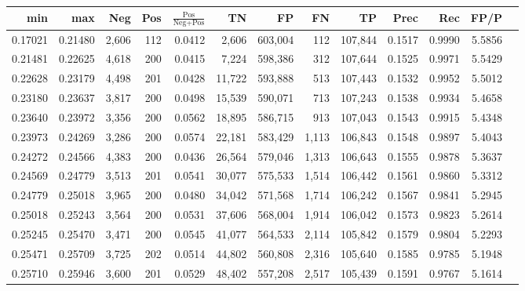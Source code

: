 \begin{tabular}{rrrrrrrrrrrrr}
\toprule
    min &     max &   Neg & Pos & $\frac{\text{Pos}}{\text{Neg}+\text{Pos}}$ &      TN &      FP &      FN &      TP &   Prec &    Rec &   FP/P \\
\midrule
0.17021 & 0.21480 & 2,606 & 112 &                                     0.0412 &   2,606 & 603,004 &     112 & 107,844 & 0.1517 & 0.9990 & 5.5856 \\
0.21481 & 0.22625 & 4,618 & 200 &                                     0.0415 &   7,224 & 598,386 &     312 & 107,644 & 0.1525 & 0.9971 & 5.5429 \\
0.22628 & 0.23179 & 4,498 & 201 &                                     0.0428 &  11,722 & 593,888 &     513 & 107,443 & 0.1532 & 0.9952 & 5.5012 \\
0.23180 & 0.23637 & 3,817 & 200 &                                     0.0498 &  15,539 & 590,071 &     713 & 107,243 & 0.1538 & 0.9934 & 5.4658 \\
0.23640 & 0.23972 & 3,356 & 200 &                                     0.0562 &  18,895 & 586,715 &     913 & 107,043 & 0.1543 & 0.9915 & 5.4348 \\
0.23973 & 0.24269 & 3,286 & 200 &                                     0.0574 &  22,181 & 583,429 &   1,113 & 106,843 & 0.1548 & 0.9897 & 5.4043 \\
0.24272 & 0.24566 & 4,383 & 200 &                                     0.0436 &  26,564 & 579,046 &   1,313 & 106,643 & 0.1555 & 0.9878 & 5.3637 \\
0.24569 & 0.24779 & 3,513 & 201 &                                     0.0541 &  30,077 & 575,533 &   1,514 & 106,442 & 0.1561 & 0.9860 & 5.3312 \\
0.24779 & 0.25018 & 3,965 & 200 &                                     0.0480 &  34,042 & 571,568 &   1,714 & 106,242 & 0.1567 & 0.9841 & 5.2945 \\
0.25018 & 0.25243 & 3,564 & 200 &                                     0.0531 &  37,606 & 568,004 &   1,914 & 106,042 & 0.1573 & 0.9823 & 5.2614 \\
0.25245 & 0.25470 & 3,471 & 200 &                                     0.0545 &  41,077 & 564,533 &   2,114 & 105,842 & 0.1579 & 0.9804 & 5.2293 \\
0.25471 & 0.25709 & 3,725 & 202 &                                     0.0514 &  44,802 & 560,808 &   2,316 & 105,640 & 0.1585 & 0.9785 & 5.1948 \\
0.25710 & 0.25946 & 3,600 & 201 &                                     0.0529 &  48,402 & 557,208 &   2,517 & 105,439 & 0.1591 & 0.9767 & 5.1614 \\

\end{tabular}

